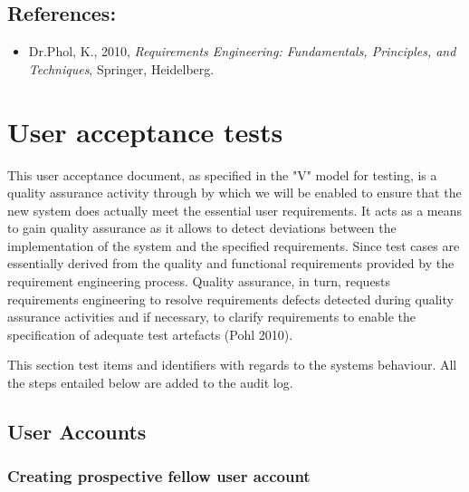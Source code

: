\documentclass[12pt]{article}
\begin{document}
\vspace{0.2in}

\subsection{References:}
\vspace{0.1in}
\begin{itemize}
\item Dr.Phol, K., 2010, \textit{Requirements Engineering: Fundamentals, Principles, and Techniques}, Springer, Heidelberg.
\end{itemize}	

\vspace{0.5in}

\section{User acceptance tests}
This user acceptance document, as specified in the "V" model for testing, is a quality assurance activity through by which we will be enabled to ensure that the new system does actually meet the essential user requirements. It acts as a means to gain quality assurance as it allows to detect deviations between the implementation of the system and the specified requirements. Since test cases are essentially derived from the quality and functional requirements provided by the requirement engineering process. Quality assurance, in turn, requests requirements engineering to resolve  requirements defects detected during quality assurance activities and if necessary, to clarify requirements to enable the specification of adequate test artefacts (Pohl 2010).

This section test items and identifiers with regards to the systems behaviour. All the steps entailed below are added to the audit log.

\subsection{User Accounts}

\subsubsection{Creating prospective fellow user account}
\end{document}
